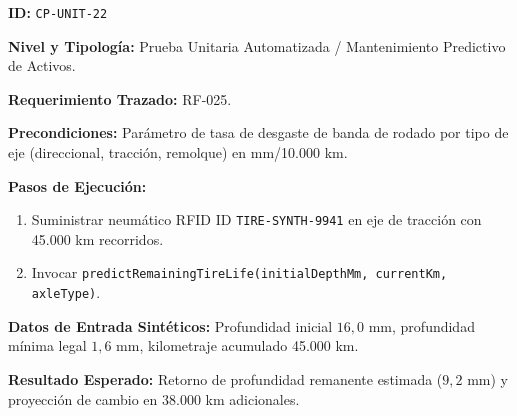 \par\noindent\textbf{ID:} \texttt{C\allowbreak{}P\allowbreak{}-\allowbreak{}U\allowbreak{}N\allowbreak{}I\allowbreak{}T\allowbreak{}-\allowbreak{}2\allowbreak{}2\allowbreak{}}\par
\par\noindent\textbf{Nivel y Tipología:} Prueba Unitaria Automatizada / Mantenimiento Predictivo de Activos.\par
\par\noindent\textbf{Requerimiento Trazado:} RF-025.\par
\par\noindent\textbf{Precondiciones:} Parámetro de tasa de desgaste de banda de rodado por tipo de eje (direccional, tracción, remolque) en mm/10.000 km.\par
\par\noindent\textbf{Pasos de Ejecución:} \par
\begin{enumerate}
\item Suministrar neumático RFID ID \texttt{T\allowbreak{}I\allowbreak{}R\allowbreak{}E\allowbreak{}-\allowbreak{}S\allowbreak{}Y\allowbreak{}N\allowbreak{}T\allowbreak{}H\allowbreak{}-\allowbreak{}9\allowbreak{}9\allowbreak{}4\allowbreak{}1\allowbreak{}} en eje de tracción con 45.000 km recorridos.
\item Invocar \texttt{p\allowbreak{}r\allowbreak{}e\allowbreak{}d\allowbreak{}i\allowbreak{}c\allowbreak{}t\allowbreak{}R\allowbreak{}e\allowbreak{}m\allowbreak{}a\allowbreak{}i\allowbreak{}n\allowbreak{}i\allowbreak{}n\allowbreak{}g\allowbreak{}T\allowbreak{}i\allowbreak{}r\allowbreak{}e\allowbreak{}L\allowbreak{}i\allowbreak{}f\allowbreak{}e\allowbreak{}(\allowbreak{}i\allowbreak{}n\allowbreak{}i\allowbreak{}t\allowbreak{}i\allowbreak{}a\allowbreak{}l\allowbreak{}D\allowbreak{}e\allowbreak{}p\allowbreak{}t\allowbreak{}h\allowbreak{}M\allowbreak{}m\allowbreak{},\allowbreak{} c\allowbreak{}u\allowbreak{}r\allowbreak{}r\allowbreak{}e\allowbreak{}n\allowbreak{}t\allowbreak{}K\allowbreak{}m\allowbreak{},\allowbreak{} a\allowbreak{}x\allowbreak{}l\allowbreak{}e\allowbreak{}T\allowbreak{}y\allowbreak{}p\allowbreak{}e\allowbreak{})\allowbreak{}}.
\end{enumerate}
\par\noindent\textbf{Datos de Entrada Sintéticos:} Profundidad inicial \(16{,}0\text{ mm}\), profundidad mínima legal \(1{,}6\text{ mm}\), kilometraje acumulado 45.000 km.\par
\par\noindent\textbf{Resultado Esperado:} Retorno de profundidad remanente estimada (\(9{,}2\text{ mm}\)) y proyección de cambio en 38.000 km adicionales.\par
